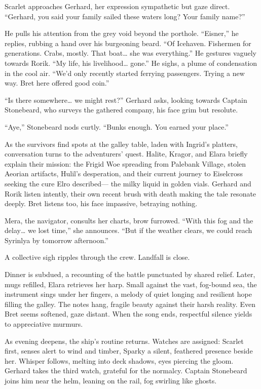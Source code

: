 \documentclass[
  letterpaper,12pt,twoside,twocolumn,openany,
  nodeprecatedcode,bg=full]{dndbook}
\begin{document}
Scarlet approaches Gerhard, her expression sympathetic but gaze direct.
``Gerhard, you said your family sailed these waters long? Your family
name?''

He pulls his attention from the grey void beyond the porthole.
``Eisner,'' he replies, rubbing a hand over his burgeoning beard. ``Of
Icehaven. Fishermen for generations. Crabs, mostly. That boat\ldots{}
she was everything.'' He gestures vaguely towards Rorik. ``My life, his
livelihood\ldots{} gone.'' He sighs, a plume of condensation in the cool
air. ``We'd only recently started ferrying passengers. Trying a new way.
Bret here offered good coin.''

``Is there somewhere\ldots{} we might rest?'' Gerhard asks, looking
towards Captain Stonebeard, who surveys the gathered company, his face
grim but resolute.

``Aye,'' Stonebeard nods curtly. ``Bunks enough. You earned your
place.''

As the survivors find spots at the galley table, laden with Ingrid's
platters, conversation turns to the adventurers' quest. Halite, Kragor,
and Elara briefly explain their mission: the Frigid Woe spreading from
Palebank Village, stolen Aeorian artifacts, Hulil's desperation, and
their current journey to Eiselcross seeking the cure Elro described---
the milky liquid in golden vials. Gerhard and Rorik listen intently,
their own recent brush with death making the tale resonate deeply. Bret
listens too, his face impassive, betraying nothing.

Mera, the navigator, consults her charts, brow furrowed. ``With this fog
and the delay\ldots{} we lost time,'' she announces. ``But if the
weather clears, we could reach Syrinlya by tomorrow afternoon.''

A collective sigh ripples through the crew. Landfall is close.

Dinner is subdued, a recounting of the battle punctuated by shared
relief. Later, mugs refilled, Elara retrieves her harp. Small against
the vast, fog-bound sea, the instrument sings under her fingers, a
melody of quiet longing and resilient hope filling the galley. The notes
hang, fragile beauty against their harsh reality. Even Bret seems
softened, gaze distant. When the song ends, respectful silence yields to
appreciative murmurs.

As evening deepens, the ship's routine returns. Watches are assigned:
Scarlet first, senses alert to wind and timber, Sparky a silent,
feathered presence beside her. Whisper follows, melting into deck
shadows, eyes piercing the gloom. Gerhard takes the third watch,
grateful for the normalcy. Captain Stonebeard joins him near the helm,
leaning on the rail, fog swirling like ghosts.
\end{document}
